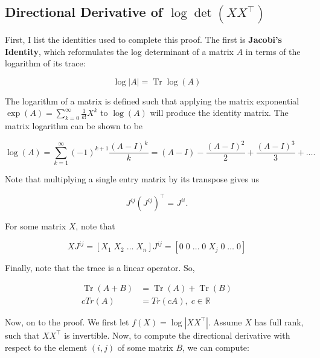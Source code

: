 \documentclass[12pt]{article}
\theoremstyle{definition}
\DeclareMathOperator{\Tr}{Tr}
\begin{document}
\subsection{Directional Derivative of $\log \det (XX^\top)$}
\label{subsec:gradLogDetDerivation}

First, I list the identities used to complete this proof. The first is \textbf{Jacobi's Identity}, which reformulates the log determinant of a matrix $A$ in terms of the logarithm of its trace:

\begin{equation}
    \label{eqn:Jacobi}
    \log |A| = \Tr \log (A)
\end{equation}

The logarithm of a matrix is defined such that applying the matrix exponential $\exp(A) = \sum_{k=0}^{\infty} \frac{1}{k!} X^k$ to $\log(A)$ will produce the identity matrix. The matrix logarithm can be shown to be

\begin{equation}
    \label{eqn:matrixLog}
    \log(A) = \sum_{k=1}^{\infty} (-1)^{k+1} \frac{(A-I)^k}{k} = (A - I) - \frac{(A-I)^2}{2} + \frac{(A-I)^3}{3} + \dots.
\end{equation}

Note that multiplying a single entry matrix by its transpose gives us

\[
J^{ij} (J^{ij})^\top = J^{ii}.
\]

For some matrix $X$, note that

\[
XJ^{ij} = [X_1 \; X_2 \; \dots \; X_n] J^{ij} = [0 \; 0 \;  \dots \; 0 \; X_j \; 0 \; \dots \;  0]
\]

Finally, note that the trace is a linear operator. So,

\[
\begin{split}
    \Tr(A + B) & = \Tr(A) + \Tr(B) \\ 
    cTr(A) &= Tr(cA), \; c \in \mathbb{R}
\end{split}
\]

Now, on to the proof. We first let $f(X) = \log |XX^\top|$. Assume $X$ has full rank, such that $XX^\top$ is invertible. Now, to compute the directional derivative with respect to the element $(i,j)$ of some matrix $B$, we can compute:
\end{document}
